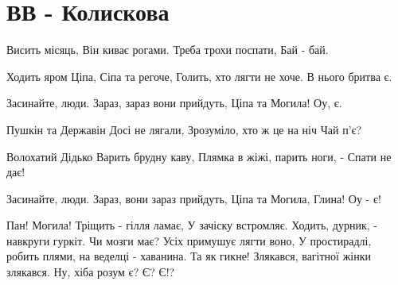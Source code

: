 \section{ВВ - Колискова}
\begin{guitar}
Висить місяць,
Він киває рогами.
Треба трохи поспати,
Бай - бай.

Ходить яром Ціпа,
Сіпа та регоче,
Голить, хто лягти не хоче.
В нього бритва є.

Засинайте, люди.
Зараз, зараз вони прийдуть,
Ціпа та Могила!
Оу, є.

Пушкін та Державін
Досі не лягали,
Зрозуміло, хто ж це на ніч
Чай п'є?

Волохатий Дідько
Варить брудну каву,
Плямка в жіжі, парить ноги, -
Спати не дає!

Засинайте, люди.
Зараз, вони зараз прийдуть,
Ціпа та Могила, Глина!
Оу - є!

Пан! Могила! Тріщить - гілля ламає,
У зачіску встромляє. Ходить, дурник, - навкруги гуркіт.
Чи мозги має? Усіх примушує лягти воно,
У простирадлі, робить плями, на веделці - хаванина.
Та як гикне! Злякався, вагітної жінки злякався.
Ну, хіба розум є? Є? Є!?
\end{guitar}
